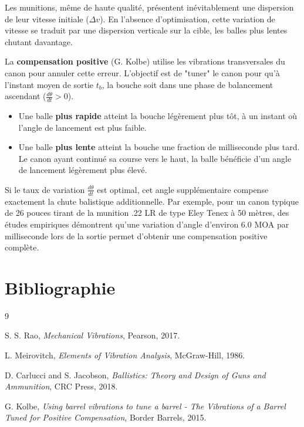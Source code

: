 \documentclass[11pt,a4paper]{article}
\begin{document}
	Les munitions, même de haute qualité, présentent inévitablement une dispersion de leur vitesse initiale ($\Delta v$). En l'absence d'optimisation, cette variation de vitesse se traduit par une dispersion verticale sur la cible, les balles plus lentes chutant davantage.
	
	La \textbf{compensation positive} (G. Kolbe) utilise les vibrations transversales du canon pour annuler cette erreur. L'objectif est de "tuner" le canon pour qu'à l'instant moyen de sortie $t_b$, la bouche soit dans une phase de balancement ascendant ($\frac{d\theta}{dt} > 0$).
	
	\begin{itemize}
		\item Une balle \textbf{plus rapide} atteint la bouche légèrement plus tôt, à un instant où l'angle de lancement est plus faible.
		\item Une balle \textbf{plus lente} atteint la bouche une fraction de milliseconde plus tard. Le canon ayant continué sa course vers le haut, la balle bénéficie d'un angle de lancement légèrement plus élevé.
	\end{itemize}
	
	Si le taux de variation $\frac{d\theta}{dt}$ est optimal, cet angle supplémentaire compense exactement la chute balistique additionnelle. Par exemple, pour un canon typique de 26 pouces tirant de la munition .22 LR de type Eley Tenex à 50 mètres, des études empiriques démontrent qu'une variation d'angle d'environ $6.0$ MOA par milliseconde lors de la sortie permet d'obtenir une compensation positive complète.
	
	\section{Bibliographie}
	
	\begin{thebibliography}{9}
		
		S. S. Rao, \textit{Mechanical Vibrations}, Pearson, 2017.
		
		L. Meirovitch, \textit{Elements of Vibration Analysis}, McGraw-Hill, 1986.
		
		D. Carlucci and S. Jacobson, \textit{Ballistics: Theory and Design of Guns and Ammunition}, CRC Press, 2018.
		
		G. Kolbe, \textit{Using barrel vibrations to tune a barrel - The Vibrations of a Barrel Tuned for Positive Compensation}, Border Barrels, 2015.
		
	\end{thebibliography}
	
\end{document}
